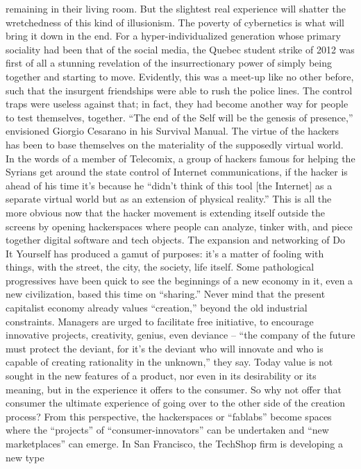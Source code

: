 \documentclass[landscape,twocolumn,letterpaper]{article}
\begin{document}
remaining in their living room. But the slightest real experience will
shatter the wretchedness of this kind of illusionism. The poverty of
cybernetics is what will bring it down in the end. For a
hyper-individualized generation whose primary sociality had been that
of the social media, the Quebec student strike of 2012 was first of
all a stunning revelation of the insurrectionary power of simply being
together and starting to move. Evidently, this was a meet-up like no
other before, such that the insurgent friendships were able to rush
the police lines. The control traps were useless against that; in
fact, they had become another way for people to test themselves,
together. “The end of the Self will be the genesis of presence,”
envisioned Giorgio Cesarano in his Survival Manual. The virtue of the
hackers has been to base themselves on the materiality of the
supposedly virtual world. In the words of a member of Telecomix, a
group of hackers famous for helping the Syrians get around the state
control of Internet communications, if the hacker is ahead of his time
it’s because he “didn’t think of this tool [the Internet] as a
separate virtual world but as an extension of physical reality.” This
is all the more obvious now that the hacker movement is extending
itself outside the screens by opening hackerspaces where people can
analyze, tinker with, and piece together digital software and tech
objects. The expansion and networking of Do It Yourself has produced a
gamut of purposes: it’s a matter of fooling with things, with the
street, the city, the society, life itself. Some pathological
progressives have been quick to see the beginnings of a new economy in
it, even a new civilization, based this time on “sharing.” Never mind
that the present capitalist economy already values “creation,” beyond
the old industrial constraints. Managers are urged to facilitate free
initiative, to encourage innovative projects, creativity, genius, even
deviance – “the company of the future must protect the deviant, for
it’s the deviant who will innovate and who is capable of creating
rationality in the unknown,” they say. Today value is not sought in
the new features of a product, nor even in its desirability or its
meaning, but in the experience it offers to the consumer. So why not
offer that consumer the ultimate experience of going over to the other
side of the creation process? From this perspective, the hackerspaces
or “fablabs” become spaces where the “projects” of
“consumer-innovators” can be undertaken and “new marketplaces” can
emerge. In San Francisco, the TechShop firm is developing a new type
\end{document}
